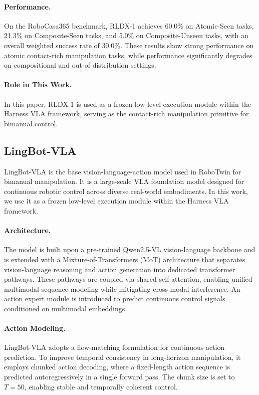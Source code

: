 \documentclass{article}
\begin{document}
\paragraph{Performance.}
On the RoboCasa365 benchmark, RLDX-1 achieves 60.0\% on Atomic-Seen tasks, 21.3\% on Composite-Seen tasks, and 5.0\% on Composite-Unseen tasks, with an overall weighted success rate of 30.0\%. These results show strong performance on atomic contact-rich manipulation tasks, while performance significantly degrades on compositional and out-of-distribution settings.

\paragraph{Role in This Work.}
In this paper, RLDX-1 is used as a frozen low-level execution module within the Harness VLA framework, serving as the contact-rich manipulation primitive for bimanual control.

\subsection{LingBot-VLA}

LingBot-VLA is the base vision-language-action model used in RoboTwin for bimanual manipulation. It is a large-scale VLA foundation model designed for continuous robotic control across diverse real-world embodiments. In this work, we use it as a frozen low-level execution module within the Harness VLA framework.

\paragraph{Architecture.}
The model is built upon a pre-trained Qwen2.5-VL vision-language backbone and is extended with a Mixture-of-Transformers (MoT) architecture that separates vision-language reasoning and action generation into dedicated transformer pathways. These pathways are coupled via shared self-attention, enabling unified multimodal sequence modeling while mitigating cross-modal interference. An action expert module is introduced to predict continuous control signals conditioned on multimodal embeddings.

\paragraph{Action Modeling.}
LingBot-VLA adopts a flow-matching formulation for continuous action prediction. To improve temporal consistency in long-horizon manipulation, it employs chunked action decoding, where a fixed-length action sequence is predicted autoregressively in a single forward pass. The chunk size is set to $T = 50$, enabling stable and temporally coherent control.
\end{document}
